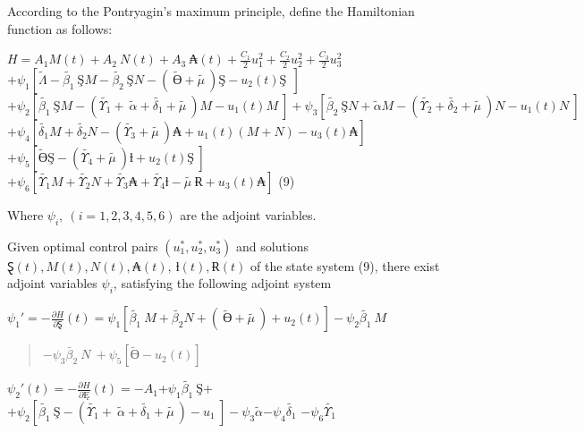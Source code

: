 \documentclass[
]{article}
\begin{document}
According to the Pontryagin's maximum principle, define the Hamiltonian function as follows:

\(H = A_{1}M(t) + A_{2}\ N(t) + A_{3}\ ₳(t) + \frac{C_{1}}{2}u_{1}^{2} + \frac{C_{2}}{2}u_{2}^{2} + \frac{C_{3}}{2}u_{3}^{2}\) \(+ \psi_{1}\left\lbrack \widetilde{\Lambda} - \widetilde{\beta_{1}}\ ŞM - \widetilde{\beta_{2}}\ ŞN - \left( \ \widetilde{Ө} + \widetilde{\mu\ } \right)Ş - u_{2}(t)Ş\ \  \right\rbrack\) \(+ \psi_{2}\left\lbrack \widetilde{\beta_{1}}\ ŞM - \left( \widetilde{\Upsilon_{1}} + \ \widetilde{\alpha} + \widetilde{\delta_{1}} + \widetilde{\mu\ } \right)M - u_{1}(t)M\  \right\rbrack + \psi_{3}\left\lbrack \widetilde{\beta_{2}}\ ŞN + \widetilde{\alpha}M - \left( \widetilde{\Upsilon_{2}} + \widetilde{\delta_{2}} + \widetilde{\mu\ } \right)N - u_{1}(t)N\  \right\rbrack\) \(+ \psi_{4}\left\lbrack \widetilde{\delta_{1}}M + \widetilde{\delta_{2}}N - \left( \widetilde{\Upsilon_{3}} + \widetilde{\mu\ } \right)₳ + u_{1}(t)(M + N) - u_{3}(t)₳ \right\rbrack\) \(+ \psi_{5}\left\lbrack \widetilde{Ө}Ş - \left( \widetilde{\Upsilon_{4}} + \widetilde{\mu\ } \right)ƚ + u_{2}(t)Ş\  \right\rbrack\) \(+ \psi_{6}\left\lbrack \widetilde{\Upsilon_{1}}M + \widetilde{\Upsilon_{2}}N + \widetilde{\Upsilon_{3}}₳ + \widetilde{\Upsilon_{4}}ƚ - \widetilde{\mu\ }Ɍ + u_{3}(t)₳ \right\rbrack\) (9)

Where \(\psi_{i},\ (i = 1,2,3,4,5,6)\) are the adjoint variables.

Given optimal control pairs \(\left( u_{1}^{*},u_{2}^{*},u_{3}^{*} \right)\) and solutions \(Ȿ(t),M(t),N(t),₳(t),\ ƚ(t),Ɍ(t)\) of the state system (9), there exist adjoint variables \(\psi_{i}\), satisfying the following adjoint system

\(\psi_{1}' = - \frac{\partial H}{\partial Ȿ}(t) = \psi_{1}\left\lbrack \widetilde{\beta_{1}}\ M + \widetilde{\beta_{2}}N + \left( \ \widetilde{Ө} + \widetilde{\mu\ } \right) + u_{2}(t) \right\rbrack - \psi_{2}\widetilde{\beta_{1}}\ M\)

\begin{quote}
\(- \psi_{3}\widetilde{\beta_{2}}\ N\  + \psi_{5}\left\lbrack \widetilde{Ө} - u_{2}(t) \right\rbrack\)
\end{quote}

\(\psi_{2}'(t) = - \frac{\partial H}{\partial Ę}(t) = - A_{1}\)+\(\psi_{1}\widetilde{\beta_{1}}\ Ş\)+\(+ \psi_{2}\left\lbrack \widetilde{\beta_{1}}\ Ş - \left( \widetilde{\Upsilon_{1}} + \ \widetilde{\alpha} + \widetilde{\delta_{1}} + \widetilde{\mu\ } \right) - u_{1}\  \right\rbrack - \psi_{3}\widetilde{\alpha}{- \psi}_{4}\widetilde{\delta_{1}}\) \(- \psi_{6}\widetilde{\Upsilon_{1}}\)
\end{document}
